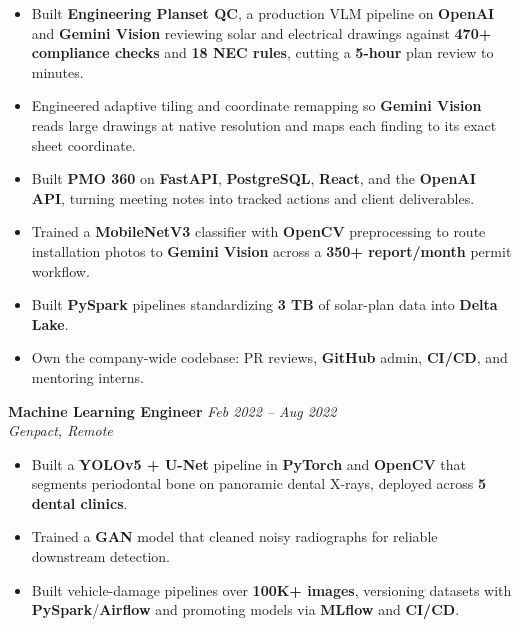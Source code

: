 \documentclass[11pt,letterpaper]{article}
\newcommand{\bulletgap}{2.6pt}   %
\newcommand{\listgap}{3pt}       %
\newcommand{\jobgap}{5pt}        %
\newenvironment{tightlist}{%
\begin{itemize}[
    leftmargin=1.2em,
    itemsep=\bulletgap,
    topsep=\listgap,
    parsep=0pt,
    label={$\bullet$}
]%
}{%
\end{itemize}%
}
\newcommand{\jobentry}[3]{%
\noindent
\colorbox{bandgray}{%
\begin{minipage}{\dimexpr\linewidth-2\fboxsep-2\fboxrule\relax}
\vspace{2pt}
{\bfseries #1} \hfill {\itshape #3}\\[-0.5pt]
{\itshape #2}
\vspace{2pt}
\end{minipage}%
}%
}
\begin{document}
\begin{tightlist}

\item Built \textbf{Engineering Planset QC}, a production VLM pipeline on
\textbf{OpenAI} and \textbf{Gemini Vision} reviewing solar and electrical
drawings against \textbf{470+ compliance checks} and \textbf{18 NEC rules},
cutting a \textbf{5-hour} plan review to minutes.

\item Engineered adaptive tiling and coordinate remapping so \textbf{Gemini
Vision} reads large drawings at native resolution and maps each finding to its
exact sheet coordinate.

\item Built \textbf{PMO 360} on \textbf{FastAPI}, \textbf{PostgreSQL},
\textbf{React}, and the \textbf{OpenAI API}, turning meeting notes into tracked
actions and client deliverables.

\item Trained a \textbf{MobileNetV3} classifier with \textbf{OpenCV}
preprocessing to route installation photos to \textbf{Gemini Vision} across a
\textbf{350+ report/month} permit workflow.

\item Built \textbf{PySpark} pipelines standardizing \textbf{3 TB} of solar-plan
data into \textbf{Delta Lake}.

\item Own the company-wide codebase: PR reviews, \textbf{GitHub} admin,
\textbf{CI/CD}, and mentoring interns.

\end{tightlist}

\vspace{\jobgap}

\jobentry{Machine Learning Engineer}{Genpact, Remote}{Feb 2022 -- Aug 2022}

\begin{tightlist}

\item Built a \textbf{YOLOv5 + U-Net} pipeline in \textbf{PyTorch} and
\textbf{OpenCV} that segments periodontal bone on panoramic dental X-rays,
deployed across \textbf{5 dental clinics}.

\item Trained a \textbf{GAN} model that cleaned noisy radiographs for reliable
downstream detection.

\item Built vehicle-damage pipelines over \textbf{100K+ images}, versioning
datasets with \textbf{PySpark}/\textbf{Airflow} and promoting models via
\textbf{MLflow} and \textbf{CI/CD}.

\end{tightlist}
\end{document}

